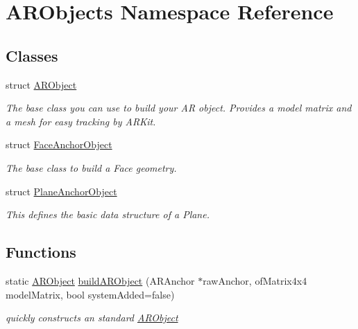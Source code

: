 \hypertarget{namespace_a_r_objects}{}\section{A\+R\+Objects Namespace Reference}
\label{namespace_a_r_objects}
\subsection*{Classes}
\begin{DoxyCompactItemize}
\item 
struct \hyperlink{struct_a_r_objects_1_1_a_r_object}{A\+R\+Object}
\begin{DoxyCompactList}\small\item\em The base class you can use to build your AR object. Provides a model matrix and a mesh for easy tracking by A\+R\+Kit. \end{DoxyCompactList}\item 
struct \hyperlink{struct_a_r_objects_1_1_face_anchor_object}{Face\+Anchor\+Object}
\begin{DoxyCompactList}\small\item\em The base class to build a Face geometry. \end{DoxyCompactList}\item 
struct \hyperlink{struct_a_r_objects_1_1_plane_anchor_object}{Plane\+Anchor\+Object}
\begin{DoxyCompactList}\small\item\em This defines the basic data structure of a Plane. \end{DoxyCompactList}\end{DoxyCompactItemize}
\subsection*{Functions}
\begin{DoxyCompactItemize}
\item 
static \hyperlink{struct_a_r_objects_1_1_a_r_object}{A\+R\+Object} \hyperlink{namespace_a_r_objects_a3721dd2b55c8de28aa62371a1d345a83}{build\+A\+R\+Object} (A\+R\+Anchor $\ast$raw\+Anchor, of\+Matrix4x4 model\+Matrix, bool system\+Added=false)
\begin{DoxyCompactList}\small\item\em quickly constructs an standard \hyperlink{struct_a_r_objects_1_1_a_r_object}{A\+R\+Object} \end{DoxyCompactList}\end{DoxyCompactItemize}


